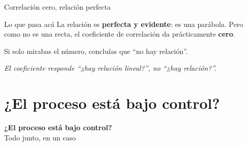 \documentclass[aspectratio=169,10pt]{beamer}
\begin{document}
\begin{frame}{Correlación cero, relación perfecta}
  \begin{center}
  \hspace{1.2em}
  \begin{minipage}{0.44\textwidth}
    \begin{alertblock}{Lo que pasa acá}
      La relación es \textbf{perfecta y evidente}: es una parábola. Pero como no es una recta,
      el coeficiente de correlación da prácticamente \textbf{cero}.

      \vspace{0.3em}
      Si solo mirabas el número, concluías que ``no hay relación''.
    \end{alertblock}
  \end{minipage}
  \end{center}
  \vspace{0.2em}
  \begin{center}
  \emph{El coeficiente responde ``¿hay relación lineal?'', no ``¿hay relación?''.}
  \end{center}
\end{frame}

\section{¿El proceso está bajo control?}

{
\begin{frame}[plain]
  \begin{center}
    {\Huge\bfseries\color{violetaOscuro} ¿El proceso está bajo control?}\\[0.6em]
    {\large Todo junto, en un caso}
  \end{center}
\end{frame}}
\end{document}
